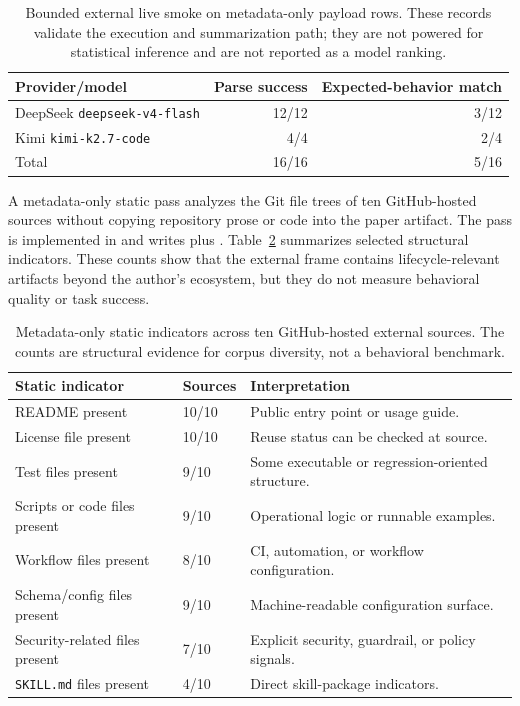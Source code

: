 \documentclass[11pt]{article}
\begin{document}
\begin{table}[t]
\centering
\small
\begin{tabular}{lrr}
\toprule
Provider/model & Parse success & Expected-behavior match \\
\midrule
DeepSeek \texttt{deepseek-v4-flash} & 12/12 & 3/12 \\
Kimi \texttt{kimi-k2.7-code} & 4/4 & 2/4 \\
\midrule
Total & 16/16 & 5/16 \\
\bottomrule
\end{tabular}
\caption{Bounded external live smoke on metadata-only payload rows. These
records validate the execution and summarization path; they are not powered for
statistical inference and are not reported as a model ranking.}
\label{tab:external-smoke}
\end{table}

A metadata-only static pass analyzes the Git file trees of ten GitHub-hosted
sources without copying repository prose or code into the paper artifact. The
pass is implemented in  and writes
 plus
. Table~\ref{tab:external-static}
summarizes selected structural indicators. These counts show that the external
frame contains lifecycle-relevant artifacts beyond the author's ecosystem, but
they do not measure behavioral quality or task success.

\begin{table}[t]
\centering
\footnotesize
\begin{tabular}{lll}
\toprule
\textbf{Static indicator} & \textbf{Sources} & \textbf{Interpretation} \\
\midrule
README present & 10/10 & Public entry point or usage guide. \\
License file present & 10/10 & Reuse status can be checked at source. \\
Test files present & 9/10 & Some executable or regression-oriented structure. \\
Scripts or code files present & 9/10 & Operational logic or runnable examples. \\
Workflow files present & 8/10 & CI, automation, or workflow configuration. \\
Schema/config files present & 9/10 & Machine-readable configuration surface. \\
Security-related files present & 7/10 & Explicit security, guardrail, or policy signals. \\
\texttt{SKILL.md} files present & 4/10 & Direct skill-package indicators. \\
\bottomrule
\end{tabular}
\caption{Metadata-only static indicators across ten GitHub-hosted external
sources. The counts are structural evidence for corpus diversity, not a
behavioral benchmark.}
\label{tab:external-static}
\end{table}
\end{document}
